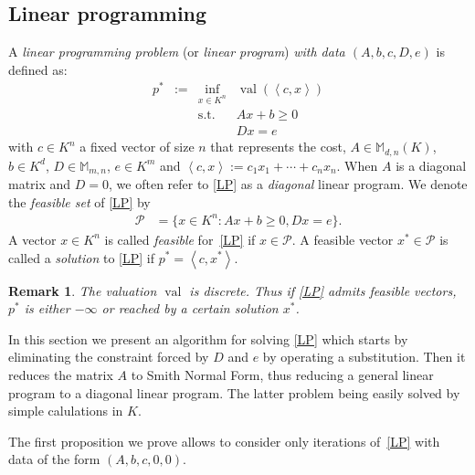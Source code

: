 \documentclass[a4paper,12pt]{article}
\newtheorem{remark}[theorem]{Remark}
\newcommand{\allmat}{\mathbb{M}} %
\newcommand{\PP}{\mathcal{P}}
\DeclareMathOperator{\val}{val}
\begin{document}




\subsection{Linear programming}


A \emph{linear programming problem} (or \emph{linear program}) \emph{with data $(A,b,c,D,e)$} is defined
as:
\begin{equation}
  \tag{LP}\label{LP}
\begin{array}{rcll}
  p^* & := & \inf_{x \in K^n} & \val(\left\langle c, x \right\rangle) \\
  &    & \text{s.t.}         & A x + b \geq 0\\
  & & & D x = e
\end{array}
\end{equation}
with $c \in K^n$ a fixed vector of size $n$ that represents the cost, $A \in \allmat_{d,n}(K)$, $b \in K^d$, $D \in \allmat_{m,n}$, $e \in K^m$ 
and $\left\langle c, x \right\rangle := c_1 x_1+\cdots +c_n x_n$. When $A$ is a diagonal matrix and $D = 0$, we often
refer to \eqref{LP} as a \emph{diagonal} linear program. We denote the \emph{feasible set} of \eqref{LP} by
\begin{equation*}
\begin{aligned}
  \PP  &= \{x \in K^n : Ax + b \geq 0, Dx = e\}.
\end{aligned}
\end{equation*}
A vector $x \in K^n$ is called \emph{feasible} for~\eqref{LP} if $x \in \PP$. A feasible vector $x^* \in \PP$
is called a \emph{solution} to \eqref{LP} if $p^* = \left\langle c,x^*\right\rangle$.

\begin{remark}
The valuation $\val$ is discrete. Thus if \eqref{LP} admits feasible vectors, $p^*$ is either $- \infty$ or reached by a certain solution $x^*$.
\end{remark}

In this section we present an algorithm for solving \eqref{LP} which starts by eliminating the constraint forced by $D$ and $e$ by operating a substitution. Then it reduces the matrix $A$ to
Smith Normal Form, thus reducing a general linear program to a diagonal linear program. The latter problem being easily solved by simple calulations in $K$.

The first proposition we prove  allows to consider only iterations of~\eqref{LP} with data of the form $(A,b,c,0,0)$.
\end{document}
